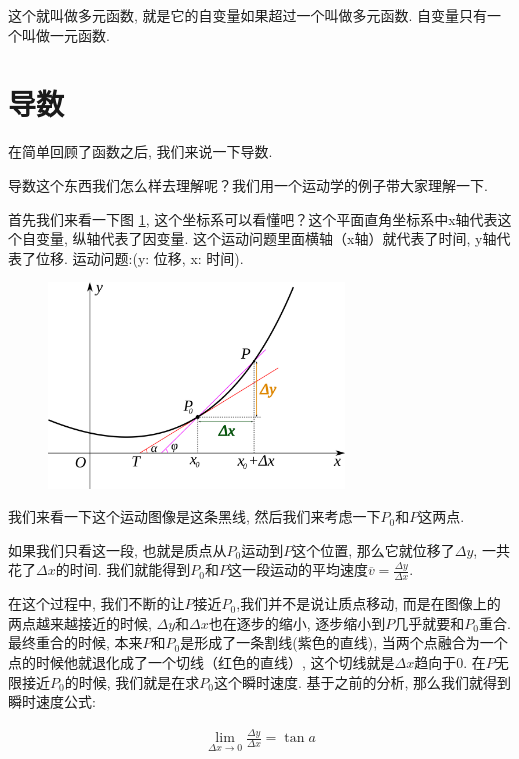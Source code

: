 这个就叫做多元函数, 就是它的自变量如果超过一个叫做多元函数. 自变量只有一个叫做一元函数. 

\section{导数}

在简单回顾了函数之后, 我们来说一下导数. 

导数这个东西我们怎么样去理解呢？我们用一个运动学的例子带大家理解一下. 

首先我们来看一下图 \ref{fig:img3_3}, 这个坐标系可以看懂吧？这个平面直角坐标系中x轴代表这个自变量, 纵轴代表了因变量. 这个运动问题里面横轴（x轴）就代表了时间, y轴代表了位移. 运动问题:(y: 位移,  x: 时间).

\begin{figure}[ht]
  \centering
  \includegraphics[width=0.7\textwidth]{asset/8b53b1a6-4a67-4402-b86a-b29dab8c535b.png}
  \caption{}
  \label{fig:img3_3}
\end{figure}


我们来看一下这个运动图像是这条黑线, 然后我们来考虑一下$P_0$和$P$这两点. 

如果我们只看这一段, 也就是质点从$P_0$运动到$P$这个位置, 那么它就位移了$\Delta y$, 一共花了$\Delta x$的时间. 我们就能得到$P_0$和$P$这一段运动的平均速度$\overline{v}=\frac{\Delta y}{\Delta x}$. 

在这个过程中, 我们不断的让$P$接近$P_0$,我们并不是说让质点移动, 而是在图像上的两点越来越接近的时候, $\Delta y$和$\Delta x$也在逐步的缩小,  逐步缩小到$P$几乎就要和$P_0$重合. 最终重合的时候, 本来$P$和$P_0$是形成了一条割线(紫色的直线), 当两个点融合为一个点的时候他就退化成了一个切线（红色的直线）, 这个切线就是$\Delta x$趋向于0. 在$P$无限接近$P_0$的时候, 我们就是在求$P_0$这个瞬时速度. 基于之前的分析, 那么我们就得到瞬时速度公式:

\begin{align*}
  \lim_{\Delta x\to0} \frac{\Delta y}{\Delta x}=\tan a
\end{align*}

